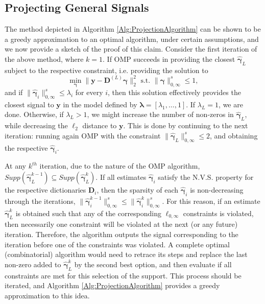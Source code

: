\documentclass[10pt,journal]{IEEEtran}
\def\y{{\mathbf y}}
\def\D{{\mathbf D}}
\def\gama{{\boldsymbol \gamma}}
\def\lamda{{\boldsymbol \lambda}}
\def\Loi{{\ell_{0,\infty}}}
\theoremstyle{plain}
\theoremstyle{definition}
\begin{document}
\subsection{Projecting General Signals}
\label{app:SketchProofProjection}
The method depicted in Algorithm \ref{Alg:ProjectionAlgorithm} can be shown to be a greedy approximation to an optimal algorithm, under certain assumptions, and we now provide a sketch of the proof of this claim. Consider the first iteration of the above method, where $k=1$. If OMP succeeds in providing the closest $\hat{\gama}_L$ subject to the respective constraint, i.e. providing the solution to 
\begin{equation}
\min_\gama \|\y - \D^{(L)} \gama\|^2_2 \text{ s.t. } \|\gama\|^s_{0,\infty} \leq 1,
\end{equation}
and if $\|\hat{\gama}_i\|^s_{0,\infty} \leq \lambda_i$ for every $i$, then this solution effectively provides the closest signal to $\y$ in the model defined by $\lamda = [\lambda_1, \dots, 1]$. If $\lambda_L = 1$, we are done.
Otherwise, if $\lambda_L > 1$, we might increase the number of non-zeros in $\hat{\gama}_L$, while decreasing the $\ell_2$ distance to $\y$. This is done by continuing to the next iteration: running again OMP with the constraint $\|\hat{\gama}_L\|^s_{0,\infty}\leq 2$, and obtaining the respective $\hat{\gama}_i$. 

At any $k^{th}$ iteration, due to the nature of the OMP algorithm, $Supp(\hat{\gama}^{k-1}_L) \subseteq Supp(\hat{\gama}^{k}_L)$. If all estimates $\hat{\gama}_i$ satisfy the N.V.S. property for the respective dictionaries $\D_i$, then the sparsity of each $\hat{\gama}_i$ is non-decreasing through the iterations, $\|\hat{\gama}^{k-1}_i\|^s_{0,\infty} \leq \|\hat{\gama}^{k}_i\|^s_{0,\infty}$. For this reason, if an estimate $\hat{\gama}^k_L$ is obtained such that any of the corresponding $\Loi$ constraints is violated, then necessarily one constraint will be violated at the next (or any future) iteration. Therefore, the algorithm outputs the signal corresponding to the iteration before one of the constraints was violated. A complete optimal (combinatorial) algorithm would need to retrace its steps and replace the last non-zero added to $\hat{\gama}^k_L$ by the second best option, and then evaluate if all constraints are met for this selection of the support. This process should be iterated, and Algorithm \ref{Alg:ProjectionAlgorithm} provides a greedy approximation to this idea.
\end{document}
